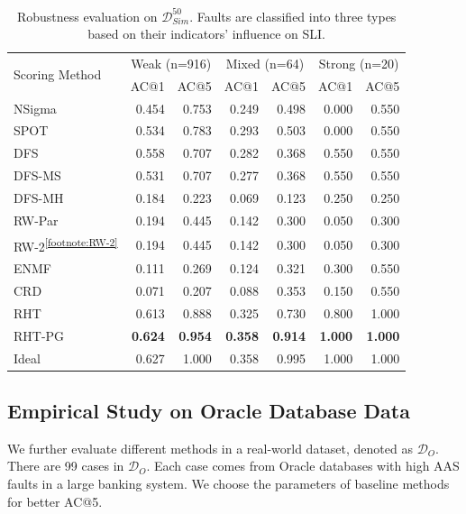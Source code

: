 \begin{table}[tb]
	\caption{Robustness evaluation on $\mathcal{D}_{Sim}^{50}$.
	Faults are classified into three types based on their indicators' influence on SLI.}\label{tab:robustness:sim50}
	\setlength{\tabcolsep}{4pt}
	\begin{tabular}{l rr rr rr}
		\toprule
		\multirow{2}{0.12\columnwidth}{Scoring Method} & \multicolumn{2}{c}{Weak (n=916)} & \multicolumn{2}{c}{Mixed (n=64)} & \multicolumn{2}{c}{Strong (n=20)} \\
		& AC@1 & AC@5 & AC@1 & AC@5 & AC@1 & AC@5 \\ 
		\midrule
		NSigma & 0.454 & 0.753 & 0.249 & 0.498 & 0.000 & 0.550 \\
		SPOT & 0.534 & 0.783 & 0.293 & 0.503 & 0.000 & 0.550 \\
		DFS & 0.558 & 0.707 & 0.282 & 0.368 & 0.550 & 0.550 \\
		DFS-MS & 0.531 & 0.707 & 0.277 & 0.368 & 0.550 & 0.550 \\
		DFS-MH & 0.184 & 0.223 & 0.069 & 0.123 & 0.250 & 0.250 \\
		RW-Par & 0.194 & 0.445 & 0.142 & 0.300 & 0.050 & 0.300 \\
		RW-2\textsuperscript{\ref{footnote:RW-2}} & 0.194 & 0.445 & 0.142 & 0.300 & 0.050 & 0.300 \\
		ENMF & 0.111 & 0.269 & 0.124 & 0.321 & 0.300 & 0.550 \\
		CRD & 0.071 & 0.207 & 0.088 & 0.353 & 0.150 & 0.550 \\
		RHT & 0.613 & 0.888 & 0.325 & 0.730 & 0.800 & 1.000 \\
        RHT-PG & \textbf{0.624} & \textbf{0.954} & \textbf{0.358} & \textbf{0.914} & \textbf{1.000} & \textbf{1.000} \\
		\midrule
        Ideal & 0.627 & 1.000 & 0.358 & 0.995 & 1.000 & 1.000 \\ 
		\bottomrule
	\end{tabular}
\end{table}

\subsection{Empirical Study on Oracle Database Data}

We further evaluate different methods in a real-world dataset, denoted as $\mathcal{D}_{O}$.
There are 99 cases in $\mathcal{D}_{O}$.
Each case comes from Oracle databases with high AAS faults in a large banking system.
We choose the parameters of baseline methods for better AC@5.

